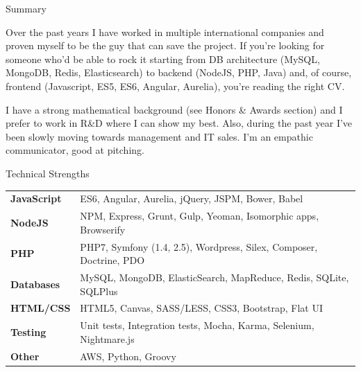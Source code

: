 \documentclass{resume} %
\begin{document}

\begin{rSection}{Summary}

Over the past years I have worked in multiple international companies and proven
myself to be the guy that can save the project. If you're looking for someone who'd be able to rock it starting from DB
architecture (MySQL, MongoDB, Redis, Elasticsearch) to backend (NodeJS, PHP, Java) and, of course, frontend
(Javascript, ES5, ES6, Angular, Aurelia), you're reading the right CV.

I have a strong mathematical background (see Honors & Awards section) and I prefer to work in R\&D where I can show my best.
Also, during the past year I've been slowly moving towards management and IT sales. I'm an empathic communicator, good at pitching.

\end{rSection}



\begin{rSection}{Technical Strengths}

\begin{tabular}{ @{} >{\bfseries}l @{\hspace{4ex}} l }
JavaScript  & ES6, Angular, Aurelia, jQuery, JSPM, Bower, Babel \\
NodeJS  & NPM, Express, Grunt, Gulp, Yeoman, Isomorphic apps, Browserify \\
PHP & PHP7, Symfony (1.4, 2.5), Wordpress, Silex, Composer, Doctrine, PDO \\
Databases & MySQL, MongoDB, ElasticSearch, MapReduce, Redis, SQLite, SQLPlus \\
HTML/CSS & HTML5, Canvas, SASS/LESS, CSS3, Bootstrap, Flat UI \\
Testing & Unit tests, Integration tests, Mocha, Karma, Selenium, Nightmare.js \\
Other & AWS, Python, Groovy
\end{tabular}

\end{rSection}
\end{document}
